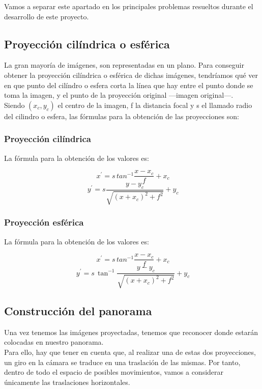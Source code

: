 \documentclass[10pt,a4paper]{article}
\theoremstyle{definition}
\begin{document}
Vamos a separar este apartado en los principales problemas resueltos durante el desarrollo de este proyecto. \\

\subsection{Proyección cilíndrica o esférica}

La gran mayoría de imágenes, son representadas en un plano. Para conseguir obtener la proyección cilíndrica o esférica de dichas imágenes, tendríamos qué ver en que punto del cilíndro o esfera corta la línea que hay entre el punto donde se toma la imagen, y el  punto de la proyección original ---imagen original---.\\

Siendo $ (x_{c}, y_{c})$ el centro de la imagen, f la distancia focal y s el llamado radio del cilindro o esfera, las fórmulas para la obtención de las proyecciones son:

\subsubsection{Proyección cilíndrica}
 
 La fórmula para la obtención de los valores es:
 
 \[
 \ x^{'} = s\, tan^{-1} \frac{x - x_{c}}{f} +  x_{c}
 \]
 \[
 \ y^{'} = s\frac{y -y_{c}}{\sqrt{(x +x_{c})^{2}+f^{2}}} + y_{c}
 \]

\subsubsection{Proyección esférica}

La fórmula para la obtención de los valores es:

 \[
 \ x^{'} = s\, tan^{-1} \frac{x - x_{c}}{f} +  x_{c}
 \]
 \[
 \ y^{'} = s\, \tan^{-1} \frac{y -y_{c}}{\sqrt{(x +x_{c})^{2}+f^{2}}} + y_{c}
 \]
\subsection{Construcción del panorama}

Una vez tenemos las imágenes proyectadas, tenemos que reconocer donde estarán colocadas en nuestro panorama.\\

Para ello, hay que tener en cuenta que, al realizar una de estas dos proyecciones, un giro en la cámara se traduce en una traslación de las mismas. Por tanto, dentro de todo el espacio de posibles movimientos, vamos a considerar únicamente las traslaciones horizontales.\\
\end{document}

